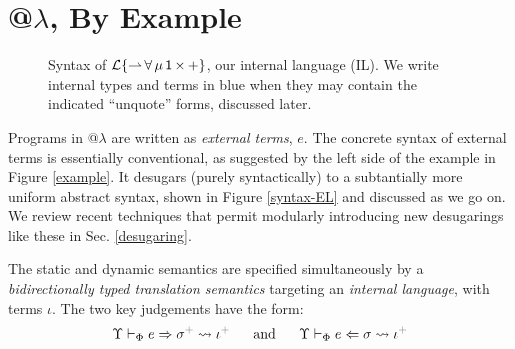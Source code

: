 \documentclass[9pt,preprint]{sigplanconf}
\newcommand{\moutput}{^{\color{gray}{+}}}
\begin{document}
\section{@$\lambda$, By Example}\label{overview}

\begin{figure}

\caption{Syntax of {$\mathcal{L}\{{\rightharpoonup}\,{\forall}\,{\mu}\,{{\sf 1}}\,{\times}\,{+}\}$}, our internal language (IL). We write internal types and terms in blue when they may contain the indicated ``unquote'' forms, discussed later.}
\label{syntax-IL}
\end{figure}


Programs in @$\lambda$ are written as \emph{external terms}, $e$. The concrete syntax of external terms is essentially conventional, as suggested by the left side of the example in Figure \ref{example}. It desugars (purely syntactically) to a subtantially more uniform abstract syntax, shown in Figure \ref{syntax-EL} and discussed as we go on. We review recent techniques that permit modularly introducing new desugarings like these in Sec. \ref{desugaring}. 

The static and dynamic semantics are specified simultaneously by a \emph{bidirectionally typed translation semantics} targeting an \emph{internal language}, with terms $\iota$. The two key judgements have the form:  \[\esynX{e}{\st\moutput}{\iota\moutput} ~~~~~\text{and}~~~~~ \eanaX{e}{\st}{\iota\moutput}\]
\noindent
\end{document}
